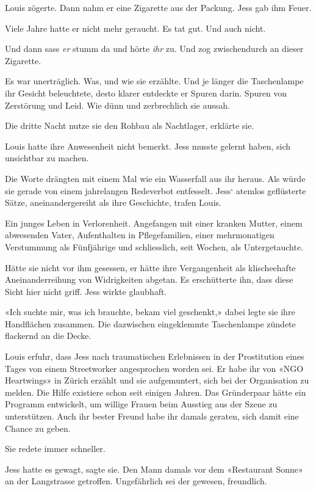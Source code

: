 Louis zögerte. Dann nahm er eine Zigarette aus der Packung. Jess gab ihm
Feuer.

Viele Jahre hatte er nicht mehr geraucht. Es tat gut. Und auch nicht.

Und dann sass \emph{er} stumm da und hörte \emph{ihr} zu. Und zog
zwischendurch an dieser Zigarette.

Es war unerträglich. Was, und wie sie erzählte. Und je länger die
Taschenlampe ihr Gesicht beleuchtete, desto klarer entdeckte er Spuren
darin. Spuren von Zerstörung und Leid. Wie dünn und zerbrechlich sie
aussah.

Die dritte Nacht nutze sie den Rohbau als Nachtlager, erklärte sie.

Louis hatte ihre Anwesenheit nicht bemerkt. Jess musste gelernt haben,
sich unsichtbar zu machen.

Die Worte drängten mit einem Mal wie ein Wasserfall aus ihr heraus. Als
würde sie gerade von einem jahrelangen Redeverbot entfesselt. Jess`
atemlos geflüsterte Sätze, aneinandergereiht als ihre Geschichte, trafen
Louis.

Ein junges Leben in Verlorenheit. Angefangen mit einer kranken Mutter,
einem abwesenden Vater, Aufenthalten in Pflegefamilien, einer
mehrmonatigen Verstummung als Fünfjährige und schliesslich, seit Wochen,
als Untergetauchte.

Hätte sie nicht vor ihm gesessen, er hätte ihre Vergangenheit als
klischeehafte Aneinanderreihung von Widrigkeiten abgetan. Es
erschütterte ihn, dass diese Sicht hier nicht griff. Jess wirkte
glaubhaft.

«Ich suchte mir, was ich brauchte, bekam viel geschenkt,» dabei legte
sie ihre Handflächen zusammen. Die dazwischen eingeklemmte Taschenlampe
zündete flackernd an die Decke.

Louis erfuhr, dass Jess nach traumatischen Erlebnissen in der
Prostitution eines Tages von einem Streetworker angesprochen worden sei.
Er habe ihr von «NGO Heartwings» in Zürich erzählt und sie aufgemuntert,
sich bei der Organisation zu melden. Die Hilfe existiere schon seit
einigen Jahren. Das Gründerpaar hätte ein Programm entwickelt, um
willige Frauen beim Ausstieg aus der Szene zu unterstützen. Auch ihr
bester Freund habe ihr damals geraten, sich damit eine Chance zu geben.

Sie redete immer schneller.

Jess hatte es gewagt, sagte sie. Den Mann damals vor dem «Restaurant
Sonne» an der Langstrasse getroffen. Ungefährlich sei der gewesen,
freundlich.

